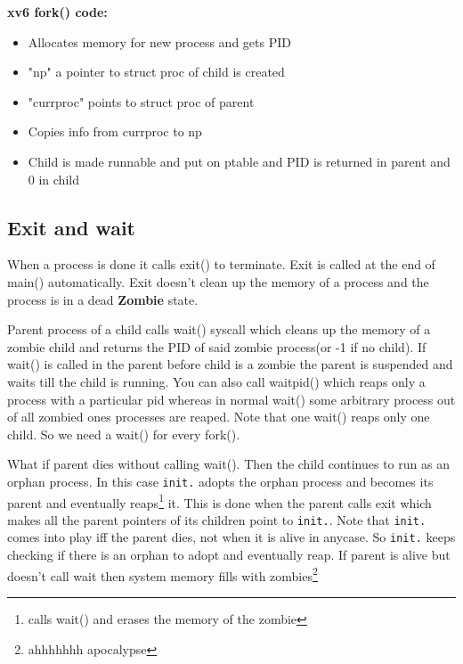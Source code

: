 \documentclass[12pt]{article}
\newcommand{\tbox}[1]{\noindent\fbox{\parbox{\textwidth}{#1}}}
\begin{document}
\textbf{xv6 fork() code:}
\begin{itemize}[topsep=0pt, partopsep=0pt, itemsep=0pt, parsep=0pt]
    \item Allocates memory for new process and gets PID
    \item "np" a pointer to struct proc of child is created
    \item "currproc" points to struct proc of parent
    \item Copies info from currproc to np
    \item Child is made runnable and put on ptable and PID is returned in parent and 0 in child
\end{itemize}

\newpage
\noindent\tbox{
    \begin{center}
    \textbf{\Huge Lecture 4}
    \end{center}
}
\subsection{Exit and wait}
When a process is done it calls exit() to terminate. Exit is called at the end of main() automatically.
Exit doesn't clean up the memory of a process and the process is in a dead \textbf{Zombie} state.

Parent process of a child calls wait() syscall which cleans up the memory of a zombie child and returns the PID of said zombie process(or -1 if no child). If wait() is called in the
parent before child is a zombie the parent is suspended and waits till the child is 
running. You can also call waitpid() which reaps only a process with a particular pid whereas in normal 
wait() some arbitrary process out of all zombied ones processes are reaped. Note that one wait() reaps only one child. So we need a wait() for every fork().


What if parent dies without calling wait(). Then the child continues to run as an orphan process. In this case \texttt{init.} 
adopts the orphan process and becomes its parent and eventually reaps\footnote{calls wait() and erases the memory of the zombie} it. This is done when the parent calls exit which makes all the parent
pointers of its children point to \texttt{init.}. Note that \texttt{init.} comes into play iff the parent dies, not when it is alive in anycase. So \texttt{init.} keeps
checking if there is an orphan to adopt and eventually reap. If parent is alive but doesn't call wait then system memory fills with zombies\footnote{ahhhhhhh apocalypse}
\end{document}
